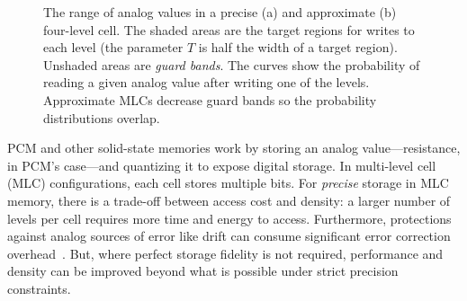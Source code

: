 \begin{figure}
    \centering
    \caption{
        The range of analog values in a precise (a) and approximate (b) four-level cell. The shaded areas are
        the target regions for writes to each level (the parameter $T$ is half
        the width of a target region). Unshaded areas are
        \emph{guard bands}. The curves show the probability of reading a given
        analog value after writing one of the levels. Approximate  MLCs
        decrease guard bands so the probability distributions overlap.
    }
    \label{approxstorage:fig:mlc}
\end{figure}

PCM and other solid-state memories
work by storing an analog value---resistance, in PCM's case---and quantizing it to expose digital
storage. In multi-level cell (MLC) configurations, each cell stores
multiple bits. For \emph{precise} storage in MLC memory,
there is a trade-off between access cost and density: a larger number
of levels per cell requires more time and energy to access.
Furthermore, protections against analog sources of error like drift can consume
significant error correction overhead~\cite{drifttolerant}.
But, where perfect storage fidelity is not required,
performance and density can be improved beyond what is possible under
strict precision constraints.

